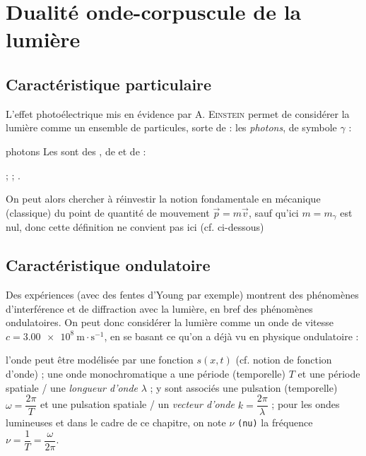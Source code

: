 \documentclass[a4paper,french,bookmarks]{article}
\begin{document}

\renewcommand{\thesubsection}{\thesection.\arabic{subsection}}    \renewcommand{\thesubsubsection}{\thesubsection.\alph{subsubsection})}

\section{Dualité onde-corpuscule de la lumière}

\subsection{Caractéristique particulaire}

L'effet photoélectrique mis en évidence par \textsc{A. Einstein} permet de considérer la lumière comme un ensemble de particules, sorte de  : les \textit{\color{main1} photons}, de symbole $\gamma$ :

\begin{definition}{photons}{}
    Les  sont des , de  et de :
    \begin{enumerate}
        \ithand {} ;
        \ithand {} ;
        \ithand {}.
    \end{enumerate}
\end{definition}



On peut alors chercher à réinvestir la notion fondamentale en mécanique (classique) du point de quantité de mouvement $\vec{p} = m \vec{v}$, sauf qu'ici $m = m_\gamma$ est nul, donc cette définition ne convient pas ici (cf. ci-dessous)

\subsection{Caractéristique ondulatoire}

Des expériences (avec des fentes d'Young par exemple) montrent des phénomènes d'interférence et de diffraction avec la lumière, en bref des phénomènes ondulatoires. On peut donc considérer la lumière comme un onde de vitesse  $c = \SI{3.00e8}{\m \cdot \s^{-1}}$, en se basant ce qu'on a déjà vu en physique ondulatoire :
\begin{enumerate}
    \itt l'onde peut être modélisée par une fonction $s\left(x, t\right)$ (cf. notion de fonction d'onde) ;
    \itt une onde monochromatique a une période (temporelle) $T$ et une période spatiale / une \textit{\color{main1} longueur d'onde} $\lambda$ ;
    \itt y sont associés une pulsation (temporelle) $\omega = \dfrac{2\pi}{T}$ et une pulsation spatiale / un \textit{\color{main1} vecteur d'onde} $k = \dfrac{2\pi}{\lambda}$ ;
    \itt pour les ondes lumineuses et dans le cadre de ce chapitre, on note $\nu$ \texttt{(nu)} la fréquence $\nu = \dfrac{1}{T} = \dfrac{\omega}{2\pi}$.
\end{enumerate}
\end{document}
